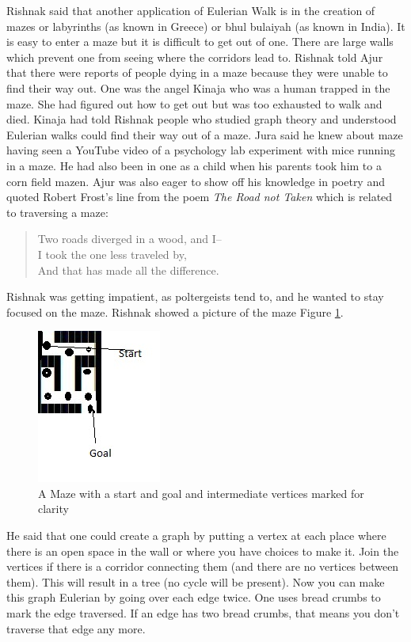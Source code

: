 Rishnak said that another application of Eulerian Walk is in the creation of mazes or labyrinths (as known in Greece) or bhul bulaiyah (as known in India).  It is easy to enter a maze but it is difficult to get out of one. There are large walls which prevent one from seeing where the corridors lead to. Rishnak told Ajur that there were reports of people dying in a maze because they were unable to find their way out. One was the angel Kinaja who was a human trapped in the maze. She had figured out how to get out but was too exhausted to walk and died. Kinaja had told Rishnak people who studied graph theory and understood Eulerian walks could find their way out of a maze. Jura said he knew about maze having seen a YouTube video of a psychology lab experiment with mice running in a maze. He had also been in one as a child when his parents took him to a corn field mazen. Ajur was also eager to show off his knowledge in poetry and quoted Robert Frost's line from the poem \emph{The Road not Taken} which is related to traversing a maze: \begin{quotation}\noindent Two roads diverged in a wood, and I--\\ 
I took the one less traveled by,\\ And that has made all the difference.
\end{quotation}

\noindent Rishnak was getting impatient, as poltergeists tend to, and he wanted to stay focused on the maze. Rishnak showed a picture of the maze Figure \ref{4g7}.
\begin{figure}
\begin{center}
\includegraphics{maze11.jpg}
\caption{A Maze with a start and goal and intermediate vertices marked for clarity}\label{4g7}
\end{center}
\end{figure}

He said that one could create a graph by putting a vertex at each place where there is an open space in the wall or where you have choices to make it. Join the vertices if there is a corridor connecting them (and there are no vertices between them). This will result in a tree (no cycle will be present). Now you can make this graph Eulerian by going over each edge twice. One uses bread crumbs to mark the edge traversed. If an edge has two bread crumbs, that means you don't traverse that edge any more.


